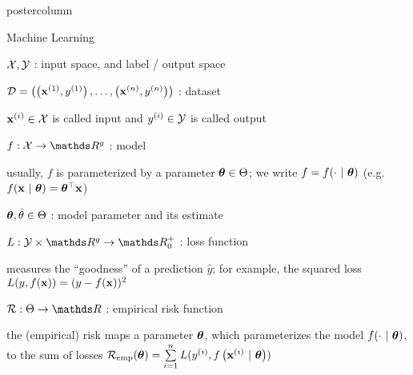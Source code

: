 \documentclass[11pt,compress,t,notes=noshow, xcolor=table]{beamer}
\begin{document}
\begin{frame}[fragile]{}
\begin{columns}
\begin{column}{.31\textwidth}
\begin{beamercolorbox}[center]{postercolumn}
\begin{minipage}{.98\textwidth}
{					\begin{myblock}{Machine Learning}
						\begin{codebox}
							$\mathcal{X}, \mathcal{Y}$ : input space, and label / output space 
						\end{codebox}
						\hspace*{1ex}
						\begin{codebox}
							 $\mathcal{D} = \left( \left(\mathbf{x}^{(1)}, y^{(1)}\right), \ldots, \left(\mathbf{x}^{(n)}, y^{(n)}\right)\right)$ : dataset
						\end{codebox}
						\hspace*{1ex} $\mathbf{x}^{(i)} \in \mathcal{X}$ is called input and $y^{(i)} \in \mathcal{Y}$ is called output \\
						\begin{codebox}
							 $f: \Xspace \to \R^g$ : model
						\end{codebox}
						\hspace*{1ex} usually, $f$ is parameterized by a parameter $\bm{\theta} \in \Theta$; we write $f = f(\cdot ~|~ \bm{\theta})$ (e.g. $f(\mathbf{x} ~|~ \bm{\theta}) = \bm{\theta}^\top \mathbf{x}$)\\
						\begin{codebox}
							 $\bm{\theta}, \hat{\theta} \in \Theta$ : model parameter and its estimate
						\end{codebox}
						\hspace*{1ex}
						\begin{codebox}
							 $L: \Yspace \times \R^g \to \R^+_0$ : loss function
						\end{codebox}
						\hspace*{1ex} measures the \enquote{goodness} of a prediction $\hat y$; for example, the squared loss $L(y, f(\mathbf{x})) = (y - f(\mathbf{x}))^2$ \\
						\begin{codebox}
							 $\risk: \Theta \to \R$ : empirical risk function
						\end{codebox}
						\hspace*{1ex} the (empirical) risk maps a parameter $\bm{\theta}$, which parameterizes the model $f(\cdot ~|~ \bm{\theta})$, to the sum of losses
						$\mathcal{R}_{\text{emp}}(\bm{\theta}) = \sum\limits_{i=1}^n L(y^{(i)}, f\left(\mathbf{x}^{(i)} ~|~ \bm{\theta}\right))$
					\end{myblock}
				}
			\end{minipage}
		\end{beamercolorbox}
	\end{column}
\end{columns}
\end{frame}

\newpage
\end{document}
